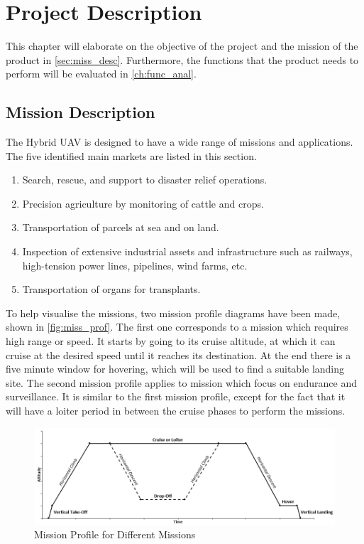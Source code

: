 \chapter{Project Description}
\setlength{\parindent}{15pt}
\label{ch:proj_desc}

This chapter will elaborate on the objective of the project and the mission of the product in \autoref{sec:miss_desc}. Furthermore, the functions that the product needs to perform will be evaluated in \autoref{ch:func_anal}.  

\section{Mission Description}
\label{sec:miss_desc}
The Hybrid UAV is designed to have a wide range of missions and applications. The five identified main markets are listed in this section.

\begin{enumerate}
\item  Search, rescue, and support to disaster relief operations.
\item  Precision agriculture by monitoring of cattle and crops.
\item  Transportation of parcels at sea and on land.
\item  Inspection of extensive industrial assets and infrastructure such as railways, high-tension power lines, pipelines, wind farms, etc.
\item Transportation of organs for transplants.
\end{enumerate}

To help visualise the missions, two mission profile diagrams have been made, shown in \autoref{fig:miss_prof}. The first one corresponds to a mission which requires high range or speed. It starts by going to its cruise altitude, at which it can cruise at the desired speed until it reaches its destination. At the end there is a five minute window for hovering, which will be used to find a suitable landing site. The second mission profile applies to mission which focus on endurance and surveillance. It is similar to the first mission profile, except for the fact that it will have a loiter period in between the cruise phases to perform the missions.

\begin{figure}[H]
    \centering
    \includegraphics[scale=0.65]{ProjectDescription/Figures/Mission_Profile}
    \caption{Mission Profile for Different Missions}
    \label{fig:miss_prof}
\end{figure}

